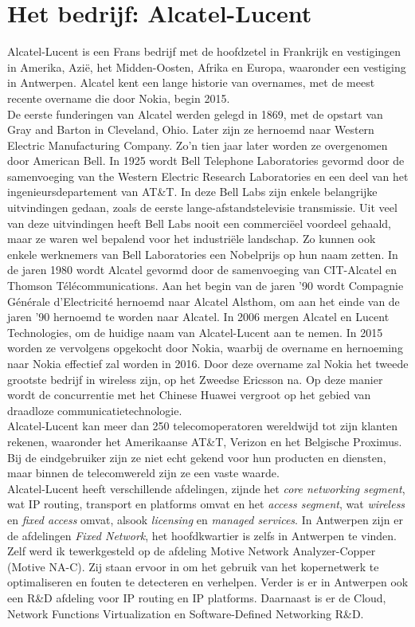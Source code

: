 \documentclass[10pt,a4paper]{article}
\begin{document}
\section{Het bedrijf: Alcatel-Lucent}
\label{bedrijf}
Alcatel-Lucent is een Frans bedrijf met de hoofdzetel in Frankrijk en vestigingen in Amerika, Azi\"e, het Midden-Oosten, Afrika en Europa, waaronder een vestiging in Antwerpen. Alcatel kent een lange historie van overnames, met de meest recente overname die door Nokia, begin 2015.\\
De eerste funderingen van Alcatel werden gelegd in 1869, met de opstart van Gray and Barton in Cleveland, Ohio. Later zijn ze hernoemd naar Western Electric Manufacturing Company. Zo'n tien jaar later worden ze overgenomen door American Bell. In 1925 wordt Bell Telephone Laboratories gevormd door de samenvoeging van the Western Electric Research Laboratories en een deel van het ingenieursdepartement van AT\&T. In deze Bell Labs zijn enkele belangrijke uitvindingen gedaan, zoals de eerste lange-afstandstelevisie transmissie. Uit veel van deze uitvindingen heeft Bell Labs nooit een commerci\"eel voordeel gehaald, maar ze waren wel bepalend voor het industri\"ele landschap. Zo kunnen ook enkele werknemers van Bell Laboratories een Nobelprijs op hun naam zetten.  In de jaren 1980 wordt Alcatel gevormd door de samenvoeging van CIT-Alcatel en Thomson T\'el\'ecommunications. Aan het begin van de jaren '90 wordt Compagnie G\'en\'erale d'Electricit\'e hernoemd naar Alcatel Alsthom, om aan het einde van de jaren '90 hernoemd te worden naar Alcatel. In 2006 mergen Alcatel en Lucent Technologies, om de huidige naam van Alcatel-Lucent aan te nemen. In 2015 worden ze vervolgens opgekocht door Nokia, waarbij de overname en hernoeming naar Nokia effectief zal worden in 2016. Door deze overname zal Nokia het tweede grootste bedrijf in wireless zijn, op het Zweedse Ericsson na. Op deze manier wordt de concurrentie met het Chinese Huawei vergroot op het gebied van draadloze communicatietechnologie.\\
Alcatel-Lucent kan meer dan 250 telecomoperatoren wereldwijd tot zijn klanten rekenen, waaronder het Amerikaanse AT\&T, Verizon en het Belgische Proximus. Bij de eindgebruiker zijn ze niet echt gekend voor hun producten en diensten, maar binnen de telecomwereld zijn ze een vaste waarde.\\
Alcatel-Lucent heeft verschillende afdelingen, zijnde het \textit{core networking segment}, wat IP routing, transport en platforms omvat en het \textit{access segment}, wat \textit{wireless} en \textit{fixed access} omvat, alsook \textit{licensing} en \textit{managed services}. In Antwerpen zijn er de afdelingen \textit{Fixed Network}, het hoofdkwartier is zelfs in Antwerpen te vinden. Zelf werd ik tewerkgesteld op de afdeling Motive Network Analyzer-Copper (Motive NA-C). Zij staan ervoor in om het gebruik van het kopernetwerk te optimaliseren en fouten te detecteren en verhelpen. Verder is er in Antwerpen ook een R\&D afdeling voor IP routing en IP platforms. Daarnaast is er de Cloud, Network Functions Virtualization en Software-Defined Networking R\&D.\\
\end{document}
